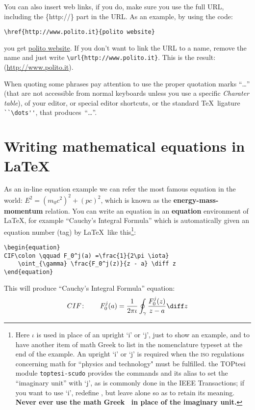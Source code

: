 You can also insert web links, if you do, make sure you use the full URL, including the \{http://\} part in the URL. As an example, by using the code: 
\begin{verbatim}
\href{http://www.polito.it}{polito website} 
\end{verbatim} 
you get \href{http://www.polito.it}{polito website}. If you don't want to link the URL to a name, remove the name and just write  \verb|\url{http://www.polito.it}|. This is the result: (\url{http://www.polito.it}).

When quoting some  phrases pay attention to use the proper quotation marks “\dots” (that are not accessible from normal keyboards unless you use a specific \emph{Charater table}), of your editor, or special editor shortcuts, or the standard \TeX\ ligature \verb|``\dots''|, that produces~``\dots''.

\section{Writing mathematical equations in \LaTeX} %
\label{section 2.2}

As an in-line equation example we can refer the most famous equation in the world: $E^2 = (m_0c^2)^2 + (pc)^2$, which is known as the \textbf{energy-mass-momentum} relation. You can write an equation in an \textbf{equation} environment of \LaTeX, for example “Cauchy's Integral Formula” which is automatically given an equation number (tag) by \LaTeX\ like this\footnote{%
Here $\iota$ is used in place of an upright `i' or `j', just to show an example, and to have another item of math Greek to list in the nomenclature typeset at the end of the example. An upright `i' or `j' is required when the \textsc{iso} regulations concerning math for “physics and technology" must be fulfilled. the TOPtesi module \texttt{toptesi-scudo} provides the commands \texttt{\string\iu} and its alias \texttt{\string\gei} to set the “imaginary unit”  with `j', as is commonly done in the IEEE Transactions; if you want to use `i', redefine \texttt{\string\iu}, but leave alone \texttt{\string\gei} so as to retain its meaning. \textbf{Never ever use the math Greek \string\iota\ in place of the imaginary unit.}}:
\begin{verbatim}
\begin{equation}
CIF\colon \qquad F_0^j(a) =\frac{1}{2\pi \iota} 
    \oint_{\gamma} \frac{F_0^j(z)}{z - a} \diff z
\end{equation}
\end{verbatim}
This will produce “Cauchy's Integral Formula” equation:
\begin{equation}
CIF\colon \qquad F_0^j(a) = \frac{1}{2\pi \iota} 
    \oint_{\gamma} \frac{F_0^j(z)}{z - a} \diff z
\label{equ:Cauchy}
\end{equation}

